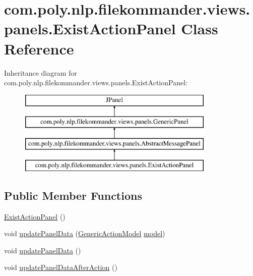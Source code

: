 \hypertarget{classcom_1_1poly_1_1nlp_1_1filekommander_1_1views_1_1panels_1_1_exist_action_panel}{\section{com.\-poly.\-nlp.\-filekommander.\-views.\-panels.\-Exist\-Action\-Panel Class Reference}
\label{classcom_1_1poly_1_1nlp_1_1filekommander_1_1views_1_1panels_1_1_exist_action_panel}
}
Inheritance diagram for com.\-poly.\-nlp.\-filekommander.\-views.\-panels.\-Exist\-Action\-Panel\-:\begin{figure}[H]
\begin{center}
\leavevmode
\includegraphics[height=4.000000cm]{classcom_1_1poly_1_1nlp_1_1filekommander_1_1views_1_1panels_1_1_exist_action_panel}
\end{center}
\end{figure}
\subsection*{Public Member Functions}
\begin{DoxyCompactItemize}
\item 
\hyperlink{classcom_1_1poly_1_1nlp_1_1filekommander_1_1views_1_1panels_1_1_exist_action_panel_a626331f0836a10b09bb8ffaaaafb8bd8}{Exist\-Action\-Panel} ()
\item 
void \hyperlink{classcom_1_1poly_1_1nlp_1_1filekommander_1_1views_1_1panels_1_1_exist_action_panel_acb5ae39de3a2efaf17b2357d90ffb10d}{update\-Panel\-Data} (\hyperlink{interfacecom_1_1poly_1_1nlp_1_1filekommander_1_1views_1_1models_1_1_generic_action_model}{Generic\-Action\-Model} \hyperlink{classcom_1_1poly_1_1nlp_1_1filekommander_1_1views_1_1panels_1_1_exist_action_panel_add9b7fcb99ef9867cf66a4a43fd0ba2b}{model})
\item 
void \hyperlink{classcom_1_1poly_1_1nlp_1_1filekommander_1_1views_1_1panels_1_1_exist_action_panel_a5bcd178361cd70336eedeec28b5b123f}{update\-Panel\-Data} ()
\item 
void \hyperlink{classcom_1_1poly_1_1nlp_1_1filekommander_1_1views_1_1panels_1_1_exist_action_panel_a759a2288117a044a4f0ff9e2fa6736fb}{update\-Panel\-Data\-After\-Action} ()
\end{DoxyCompactItemize}
